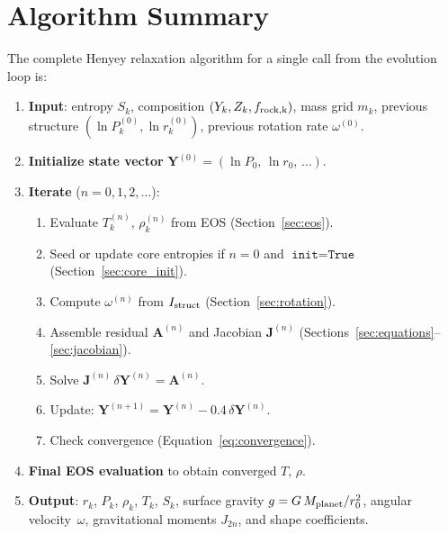 \documentclass{aastex631}
\begin{document}
\section{Algorithm Summary}\label{sec:algorithm}

The complete Henyey relaxation algorithm for a single call from the
evolution loop is:

\begin{enumerate}
  \item \textbf{Input}: entropy $S_k$, composition $(Y_k, Z_k,
    f_{\rm rock,k})$, mass grid $m_k$, previous structure
    $(\ln P_k^{(0)}, \ln r_k^{(0)})$, previous rotation rate
    $\omega^{(0)}$.

  \item \textbf{Initialize state vector}
    $\mathbf{Y}^{(0)} = (\ln P_0,\,\ln r_0,\,\ldots)$.

  \item \textbf{Iterate} ($n = 0,1,2,\ldots$):
  \begin{enumerate}
    \item Evaluate $T_k^{(n)}$, $\rho_k^{(n)}$ from EOS
      (Section~\ref{sec:eos}).
    \item Seed or update core entropies if $n = 0$ and
      $\texttt{init} = \texttt{True}$
      (Section~\ref{sec:core_init}).
    \item Compute $\omega^{(n)}$ from $I_{\rm struct}$
      (Section~\ref{sec:rotation}).
    \item Assemble residual $\mathbf{A}^{(n)}$ and Jacobian
      $\mathbf{J}^{(n)}$ (Sections~\ref{sec:equations}--\ref{sec:jacobian}).
    \item Solve $\mathbf{J}^{(n)}\,\delta\mathbf{Y}^{(n)} =
      \mathbf{A}^{(n)}$.
    \item Update: $\mathbf{Y}^{(n+1)} = \mathbf{Y}^{(n)} -
      0.4\,\delta\mathbf{Y}^{(n)}$.
    \item Check convergence (Equation~\ref{eq:convergence}).
  \end{enumerate}

  \item \textbf{Final EOS evaluation} to obtain converged $T$, $\rho$.

  \item \textbf{Output}: $r_k$, $P_k$, $\rho_k$, $T_k$, $S_k$,
    surface gravity $g = G\,M_{\rm planet}/r_0^2$,
    angular velocity~$\omega$, gravitational moments $J_{2n}$,
    and shape coefficients.
\end{enumerate}
\end{document}
